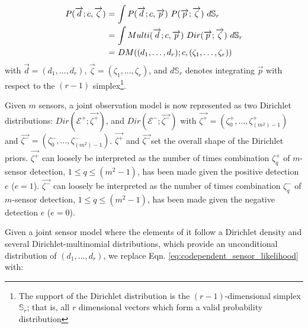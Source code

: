 \begin{equation}
	\label{eq:beta_binomial_revisit}
	\begin{tabular}{r@{ = }l}
        $P(\overrightarrow{d} ; c, \overrightarrow{\zeta})$ & $\displaystyle\int P(\overrightarrow{d} ; c, \overrightarrow{p}) ~ P(\overrightarrow{p} ; \overrightarrow{\zeta}) ~d\mathbb S_r$ \\ [2ex]
        & $\displaystyle\int Multi(\overrightarrow{d} ; c, \overrightarrow{p}) ~ Dir(\overrightarrow{p} ; \overrightarrow{\zeta}) ~d\mathbb S_r$ \\ [2ex]
        & $DM((d_1, \ldots, d_r) ; c, (\zeta_1, \ldots, \zeta_r))$
	\end{tabular}
\end{equation}
\noindent with $\overrightarrow{d} = (d_1, \ldots, d_r)$, $\overrightarrow{\zeta} = (\zeta_1, \ldots, \zeta_r)$, and $d\mathbb S_r$ denotes integrating $\overrightarrow{p}$ with respect to the $(r - 1)$ simplex\footnote{The support of the Dirichlet distribution is the $(r - 1)$-dimensional simplex $\mathbb S_r$; that is, all $r$ dimensional vectors which form a valid probability distribution}.

Given $m$ sensors, a joint observation model is now represented as two Dirichlet distributions: $Dir(\mathcal{E^+} ; \overrightarrow{\zeta^+})$, and $Dir(\mathcal{E^-} ; \overrightarrow{\zeta^-})$ with $\overrightarrow{\zeta^+} = (\zeta^+_0, \ldots, \zeta^+_{(m^2)-1})$ and $\overrightarrow{\zeta^-} = (\zeta^-_0, \ldots, \zeta^-_{(m^2)-1})$. $\overrightarrow{\zeta^+}$ and $\overrightarrow{\zeta^-}$set the overall shape of the Dirichlet priors. $\overrightarrow{\zeta^+}$ can loosely be interpreted as the number of times combination $\zeta^+_q$ of $m$-sensor detection, $1 \leq q \leq (m^2-1)$, has been made given the positive detection $e$ ($e=1$). $\overrightarrow{\zeta^-}$ can loosely be interpreted as the number of times combination $\zeta^-_q$ of $m$-sensor detection, $1 \leq q \leq (m^2-1)$, has been made given the negative detection $e$ ($e=0$).

Given a joint sensor model where the elements of it follow a Dirichlet density and several Dirichlet-multinomial distributions, which provide an unconditional distribution of $(d_1, \ldots, d_r)$, we replace Eqn. \ref{eq:codependent_sensor_likelihood} with:  


